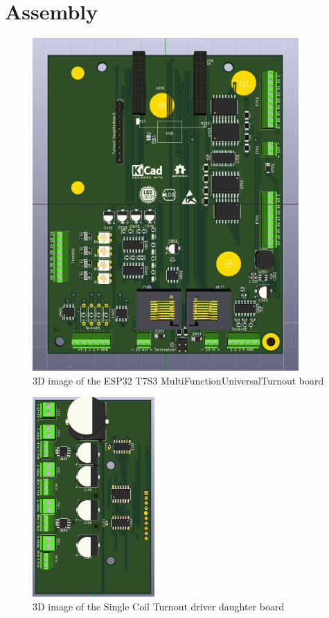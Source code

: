 \documentclass[12pt,twoside]{article}
\begin{document}
\section{Assembly}
\begin{figure}[hbpt]\begin{centering}%
\includegraphics[width=4in]{ESP32-T7S3-MultiFunctionUniversalTurnout.png}
\caption{3D image of the ESP32 T7S3 MultiFunctionUniversalTurnout board}
\end{centering}\end{figure}
\begin{figure}[hbpt]\begin{centering}%
\includegraphics[height=3in]{SC-DaughterBoard.png}
\caption{3D image of the Single Coil Turnout driver daughter board}
\end{centering}\end{figure}
\end{document}
